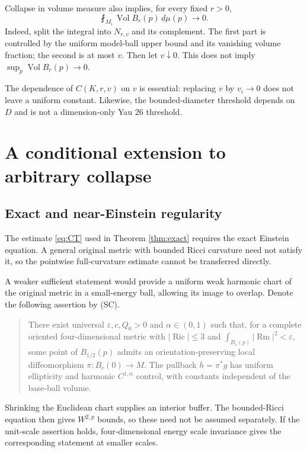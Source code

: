 \documentclass[a4paper,11pt]{article}
\theoremstyle{paper}
\DeclareMathOperator{\Ric}{Ric}
\DeclareMathOperator{\Rm}{Rm}
\DeclareMathOperator{\Vol}{Vol}
\newcommand{\dd}{\,d\mu}
\newcommand{\av}{\fint}
\numberwithin{equation}{section}
\begin{document}
Collapse in volume measure also implies, for every fixed $r>0$,
\begin{equation}\label{eq:mean-ball}
\av_{M_i}\Vol B_r(p)\dd(p)\longrightarrow0.
\end{equation}
Indeed, split the integral into $N_{r,v}$ and its complement. The first part is controlled by the uniform model-ball upper bound and its vanishing volume fraction; the second is at most $v$. Then let $v\downarrow0$. This does not imply $\sup_p\Vol B_r(p)\to0$.

The dependence of $C(K,r,v)$ on $v$ is essential: replacing $v$ by $v_i\to0$ does not leave a uniform constant. Likewise, the bounded-diameter threshold depends on $D$ and is not a dimension-only Yau 26 threshold.

\section{A conditional extension to arbitrary collapse}

\subsection{Exact and near-Einstein regularity}

The estimate \eqref{eq:CT} used in Theorem \ref{thm:exact} requires the exact Einstein equation. A general original metric with bounded Ricci curvature need not satisfy it, so the pointwise full-curvature estimate cannot be transferred directly.

A weaker sufficient statement would provide a uniform weak harmonic chart of the original metric in a small-energy ball, allowing its image to overlap. Denote the following assertion by (SC).

\begin{quote}
There exist universal $\varepsilon,c,Q_0>0$ and $\alpha\in(0,1)$ such that, for a complete oriented four-dimensional metric with $|\Ric|\le3$ and $\int_{B_1(p)}|\Rm|^2<\varepsilon$, some point of $B_{1/2}(p)$ admits an orientation-preserving local diffeomorphism $\pi:B_c(0)\to M$. The pullback $h=\pi^*g$ has uniform ellipticity and harmonic $C^{1,\alpha}$ control, with constants independent of the base-ball volume.
\end{quote}

Shrinking the Euclidean chart supplies an interior buffer. The bounded-Ricci equation then gives $W^{2,p}$ bounds, so these need not be assumed separately. If the unit-scale assertion holds, four-dimensional energy scale invariance gives the corresponding statement at smaller scales.
\end{document}

